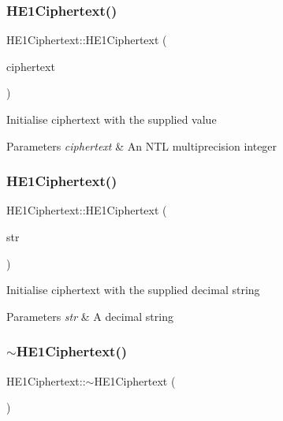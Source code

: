 \subsubsection{\texorpdfstring{H\+E1\+Ciphertext()}{HE1Ciphertext()}\hspace{0.1cm}{\footnotesize\ttfamily [3/4]}}
{\footnotesize\ttfamily H\+E1\+Ciphertext\+::\+H\+E1\+Ciphertext (\begin{DoxyParamCaption}\item[{N\+T\+L\+::\+ZZ \&}]{ciphertext }\end{DoxyParamCaption})}

Initialise {\ttfamily ciphertext} with the supplied value 
\begin{DoxyParams}{Parameters}
{\em ciphertext} & An N\+TL multiprecision integer \\
\hline
\end{DoxyParams}
\mbox{\label{classHE1Ciphertext_a1f1b6b024af4615bc3a54025c42382dc}} 
\subsubsection{\texorpdfstring{H\+E1\+Ciphertext()}{HE1Ciphertext()}\hspace{0.1cm}{\footnotesize\ttfamily [4/4]}}
{\footnotesize\ttfamily H\+E1\+Ciphertext\+::\+H\+E1\+Ciphertext (\begin{DoxyParamCaption}\item[{std\+::string \&}]{str }\end{DoxyParamCaption})}

Initialise {\ttfamily ciphertext} with the supplied decimal string 
\begin{DoxyParams}{Parameters}
{\em str} & A decimal string \\
\hline
\end{DoxyParams}
\mbox{\label{classHE1Ciphertext_ab5b083f4f4d980d127751df627b976e9}} 
\subsubsection{\texorpdfstring{$\sim$\+H\+E1\+Ciphertext()}{~HE1Ciphertext()}}
{\footnotesize\ttfamily H\+E1\+Ciphertext\+::$\sim$\+H\+E1\+Ciphertext (\begin{DoxyParamCaption}{ }\end{DoxyParamCaption})\hspace{0.3cm}{\ttfamily [virtual]}}

